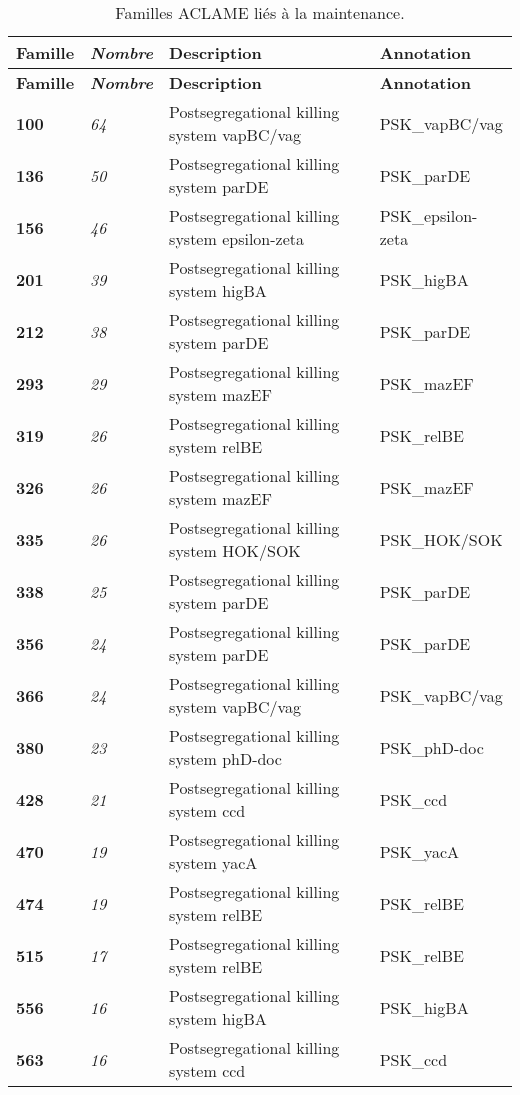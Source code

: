 \begin{longtable}{ >{\bfseries\small}p{}| >{\itshape\small}p{} >{\small}p{} | >{\small}p{}}
 \caption{Familles ACLAME liés à la maintenance.}\\
{\normalsize\bf Famille} & {\normalsize\bf Nombre} & {\normalsize\bf Description} & {\normalsize\bf Annotation}\\
\endfirsthead
{\normalsize\bf Famille} & {\normalsize\bf Nombre} & {\normalsize\bf Description} & {\normalsize\bf Annotation}\\
\endhead
100 & 64 & Postsegregational killing system vapBC/vag & PSK\_vapBC/vag\\
136 & 50 & Postsegregational killing system parDE & PSK\_parDE\\
156 & 46 & Postsegregational killing system epsilon-zeta & PSK\_epsilon-zeta\\
201 & 39 & Postsegregational killing system higBA & PSK\_higBA\\
212 & 38 & Postsegregational killing system parDE & PSK\_parDE\\
293 & 29 & Postsegregational killing system mazEF & PSK\_mazEF\\
319 & 26 & Postsegregational killing system relBE & PSK\_relBE\\
326 & 26 & Postsegregational killing system mazEF & PSK\_mazEF\\
335 & 26 & Postsegregational killing system HOK/SOK & PSK\_HOK/SOK\\
338 & 25 & Postsegregational killing system parDE & PSK\_parDE\\
356 & 24 & Postsegregational killing system parDE & PSK\_parDE\\
366 & 24 & Postsegregational killing system vapBC/vag & PSK\_vapBC/vag\\
380 & 23 & Postsegregational killing system phD-doc & PSK\_phD-doc\\
428 & 21 & Postsegregational killing system ccd & PSK\_ccd\\
470 & 19 & Postsegregational killing system yacA & PSK\_yacA\\
474 & 19 & Postsegregational killing system relBE & PSK\_relBE\\
515 & 17 & Postsegregational killing system relBE & PSK\_relBE\\
556 & 16 & Postsegregational killing system higBA & PSK\_higBA\\
563 & 16 & Postsegregational killing system ccd & PSK\_ccd\\

\end{longtable}
